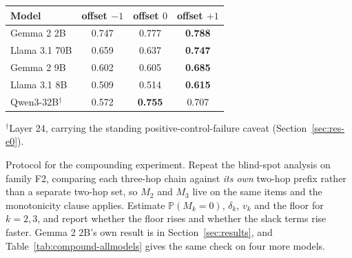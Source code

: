 \documentclass{article}
\begin{document}
\begin{center}
\small
{}
\label{tab:latent-allmodels}
\vspace{1pt}
\begin{tabular}{@{}lccc@{}}
\toprule
\textbf{Model} & \textbf{offset $-1$} & \textbf{offset $0$} & \textbf{offset $+1$}\\
\midrule
Gemma 2 2B          & 0.747 & 0.777 & \textbf{0.788}\\
Llama 3.1 70B       & 0.659 & 0.637 & \textbf{0.747}\\
Gemma 2 9B          & 0.602 & 0.605 & \textbf{0.685}\\
Llama 3.1 8B        & 0.509 & 0.514 & \textbf{0.615}\\
Qwen3-32B$^\dagger$ & 0.572 & \textbf{0.755} & 0.707\\
\bottomrule
\end{tabular}

\vspace{2pt}
{\footnotesize $^\dagger$Layer 24, carrying the standing positive-control-failure caveat
(Section~\ref{sec:res-e0}).}
\end{center}

Protocol for the compounding experiment. Repeat the blind-spot analysis on family F2, comparing each
three-hop chain against \emph{its own} two-hop
prefix rather than a separate two-hop set, so $M_2$ and $M_3$ live on the same items and the
monotonicity clause applies. Estimate $\mathbb{P}(M_k=0)$, $\delta_k$, $v_k$ and the floor for
$k=2,3$, and report whether the floor rises and whether the slack terms rise faster. Gemma 2 2B's own
result is in Section~\ref{sec:results}, and Table~\ref{tab:compound-allmodels} gives the same check on
four more models.
\end{document}
